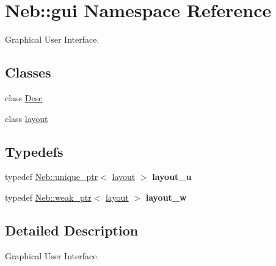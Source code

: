 \hypertarget{namespaceNeb_1_1gui}{\section{\-Neb\-:\-:gui \-Namespace \-Reference}
\label{namespaceNeb_1_1gui}
}


\-Graphical \-User \-Interface.  


\subsection*{\-Classes}
\begin{DoxyCompactItemize}
\item 
class \hyperlink{classNeb_1_1gui_1_1Desc}{\-Desc}
\item 
class \hyperlink{classNeb_1_1gui_1_1layout}{layout}
\end{DoxyCompactItemize}
\subsection*{\-Typedefs}
\begin{DoxyCompactItemize}
\item 
\hypertarget{namespaceNeb_1_1gui_a316200f998c72b90e5c6789964840289}{typedef \hyperlink{classNeb_1_1unique__ptr}{\-Neb\-::unique\-\_\-ptr}$<$ \hyperlink{classNeb_1_1gui_1_1layout}{layout} $>$ {\bfseries layout\-\_\-u}}\label{namespaceNeb_1_1gui_a316200f998c72b90e5c6789964840289}

\item 
\hypertarget{namespaceNeb_1_1gui_a9aed3ccb6af186c3c551408314836619}{typedef \hyperlink{classNeb_1_1weak__ptr}{\-Neb\-::weak\-\_\-ptr}$<$ \hyperlink{classNeb_1_1gui_1_1layout}{layout} $>$ {\bfseries layout\-\_\-w}}\label{namespaceNeb_1_1gui_a9aed3ccb6af186c3c551408314836619}

\end{DoxyCompactItemize}


\subsection{\-Detailed \-Description}
\-Graphical \-User \-Interface. 
